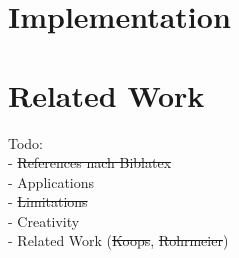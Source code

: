 \documentclass[a4paper,11pt, fleqn]{article}
\date{\today}
\author{Thats Me}
\begin{document}

\tableofcontents 

\clearpage


\clearpage
\section{Implementation}









\clearpage
\section{Related Work}



\clearpage


\clearpage
\noindent
Todo:\\
- \sout{References nach Biblatex}\\
- Applications\\
- \sout{Limitations}\\
- Creativity\\
- Related Work (\sout{Koops}, \sout{Rohrmeier})

%

\printbibliography
\end{document}
